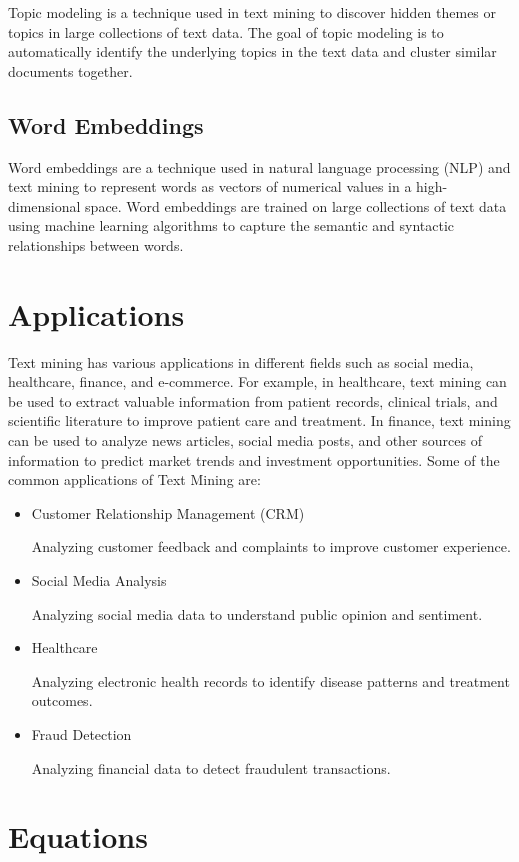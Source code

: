 \documentclass{article}
\begin{document}
Topic modeling is a technique used in text mining to discover hidden themes or topics in large collections of text data. The goal of topic modeling is to automatically identify the underlying topics in the text data and cluster similar documents together.

\subsection{Word Embeddings}

Word embeddings are a technique used in natural language processing (NLP) and text mining to represent words as vectors of numerical values in a high-dimensional space. Word embeddings are trained on large collections of text data using machine learning algorithms to capture the semantic and syntactic relationships between words.

\section{Applications}

Text mining has various applications in different fields such as social media, healthcare, finance, and e-commerce. For example, in healthcare, text mining can be used to extract valuable information from patient records, clinical trials, and scientific literature to improve patient care and treatment. In finance, text mining can be used to analyze news articles, social media posts, and other sources of information to predict market trends and investment opportunities\cite{RefWork:1}. Some of the common applications of Text Mining are:
\begin{itemize}
\item{Customer Relationship Management (CRM)}

Analyzing customer feedback and complaints to improve customer experience.
\item{Social Media Analysis}

Analyzing social media data to understand public opinion and sentiment.
\item{Healthcare}

Analyzing electronic health records to identify disease patterns and treatment outcomes.
\item{Fraud Detection}

Analyzing financial data to detect fraudulent transactions.
\end{itemize}

\section{Equations}
\end{document}
